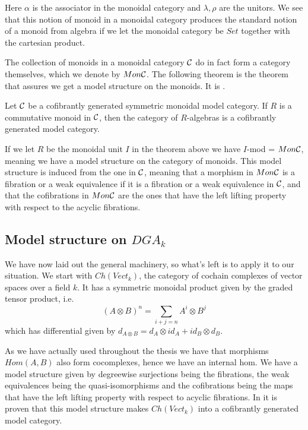 Here $ \alpha$ is the associator in the monoidal category and $ \lambda, \rho$ are the unitors. We see that this notion of monoid in a monoidal category produces the standard notion of a monoid from algebra if we let the monoidal category be $Set$ together with the cartesian product. 

The collection of monoids in a monoidal category $\mathcal{C}$ do in fact form a category themselves, which we denote by $Mon\mathcal{C}$. The following theorem is the theorem that assures we get a model structure on the monoids. It is \cite[Theorem 4.1 (3)]{monoid}. 

\begin{theorem}
Let $\mathcal{C}$ be a cofibrantly generated symmetric monoidal model category. If $R$ is a commutative monoid in $\mathcal{C}$, then the category of $R$-algebras is a cofibrantly generated model category. 
\end{theorem}

If we let $R$ be the monoidal unit $I$ in the theorem above we have $I$-mod = $Mon\mathcal{C}$, meaning we have a model structure on the category of monoids. This model structure is induced from the one in $\mathcal{C}$, meaning that a morphism in $Mon\mathcal{C}$ is a fibration or a weak equivalence if it is a fibration or a weak equivalence in $\mathcal{C}$, and that the cofibrations in $Mon\mathcal{C}$ are the ones that have the left lifting property with respect to the acyclic fibrations. 

\subsection*{Model structure on $DGA_k$}

We have now laid out the general machinery, so what's left is to apply it to our situation. We start with $Ch(Vect_k)$, the category of cochain complexes of vector spaces over a field $k$. It has a symmetric monoidal product given by the graded tensor product, i.e.
\begin{equation*}
    (A\otimes B)^n = \sum_{i+j=n} A^i \otimes B^j
\end{equation*}
which has differential given by $d_{A\otimes B} = d_A\otimes id_A + id_B\otimes d_B$. 

As we have actually used throughout the thesis we have that morphisms $Hom(A, B)$ also form cocomplexes, hence we have an internal hom. We have a model structure given by degreewise surjections being the fibrations, the weak equivalences being the quasi-isomorphisms and the cofibrations being the maps that have the left lifting property with respect to acyclic fibrations. In \cite[2.3.11]{hovey} it is proven that this model structure makes $Ch(Vect_k)$ into a cofibrantly generated model category. 

